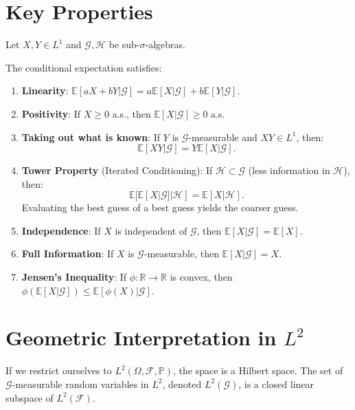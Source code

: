 \section{Key Properties}
Let $X, Y \in L^1$ and $\mathcal{G}, \mathcal{H}$ be sub-$\sigma$-algebras.

\begin{proposition}
The conditional expectation satisfies:
\begin{enumerate}
    \item \textbf{Linearity}: $\mathbb{E}[aX + bY | \mathcal{G}] = a\mathbb{E}[X|\mathcal{G}] + b\mathbb{E}[Y|\mathcal{G}]$.
    \item \textbf{Positivity}: If $X \geq 0$ a.s., then $\mathbb{E}[X|\mathcal{G}] \geq 0$ a.s.
    \item \textbf{Taking out what is known}: If $Y$ is $\mathcal{G}$-measurable and $XY \in L^1$, then:
    \[
    \mathbb{E}[XY|\mathcal{G}] = Y \mathbb{E}[X|\mathcal{G}].
    \]
    \item \textbf{Tower Property} (Iterated Conditioning): If $\mathcal{H} \subset \mathcal{G}$ (less information in $\mathcal{H}$), then:
    \[
    \mathbb{E}[ \mathbb{E}[X|\mathcal{G}] | \mathcal{H} ] = \mathbb{E}[X|\mathcal{H}].
    \]
    Evaluating the best guess of a best guess yields the coarser guess.
    \item \textbf{Independence}: If $X$ is independent of $\mathcal{G}$, then $\mathbb{E}[X|\mathcal{G}] = \mathbb{E}[X]$.
    \item \textbf{Full Information}: If $X$ is $\mathcal{G}$-measurable, then $\mathbb{E}[X|\mathcal{G}] = X$.
    \item \textbf{Jensen's Inequality}: If $\phi: \mathbb{R} \to \mathbb{R}$ is convex, then $\phi(\mathbb{E}[X|\mathcal{G}]) \leq \mathbb{E}[\phi(X)|\mathcal{G}]$.
\end{enumerate}
\end{proposition}

\section{Geometric Interpretation in \texorpdfstring{$L^2$}{L2}}

If we restrict ourselves to $L^2(\Omega, \mathcal{F}, \mathbb{P})$, the space is a Hilbert space. The set of $\mathcal{G}$-measurable random variables in $L^2$, denoted $L^2(\mathcal{G})$, is a closed linear subspace of $L^2(\mathcal{F})$.

